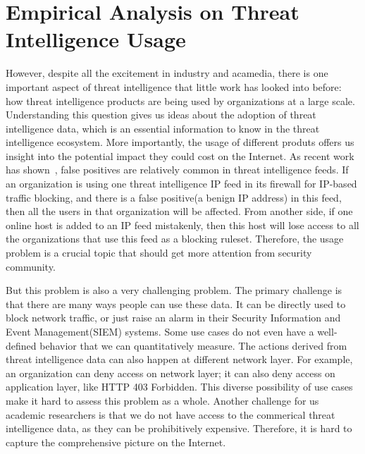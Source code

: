 \section{Empirical Analysis on Threat Intelligence Usage}

However, despite all the excitement in industry and acamedia, there is one
important aspect of threat intelligence that little work has looked into before:
how threat intelligence products are being used by organizations at a large scale.
Understanding this question gives us ideas about the adoption of threat
intelligence data, which is an essential information to know in the threat
intelligence ecosystem. More importantly, the usage of different produts offers
us insight into the potential impact they could cost on the Internet.
As recent work has shown~\cite{li2019reading}, false positives are relatively
common in threat intelligence feeds. If an organization is using one threat
intelligence IP feed in its firewall for IP-based traffic blocking, and there
is a false positive(a benign IP address) in this feed, then all the users in
that organization will be affected. From another side, if one online host is
added to an IP feed mistakenly, then this host will lose access to all the
organizations that use this feed as a blocking ruleset. Therefore, the usage
problem is a crucial topic that should get more attention from security community.

But this problem is also a very challenging problem. The primary challenge 
is that there are many ways people can use these data. It can be directly 
used to block network traffic, or just raise an alarm in their Security
Information and Event
Management(SIEM) systems. Some use cases do not even have a well-defined
behavior that we can quantitatively measure. The actions derived from threat
intelligence data can also happen at different network layer. For example, an
organization can deny access on network layer; it can also deny access on
application layer, like HTTP 403 Forbidden. This diverse possibility of use
cases make it hard to assess this problem as a whole. Another challenge for us
academic researchers is that we do not have access to the commerical threat
intelligence data, as they can be prohibitively expensive. Therefore, it is hard
to capture the comprehensive picture on the Internet.